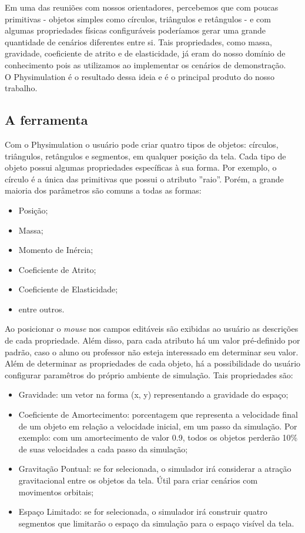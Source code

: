Em uma das reuniões com nossos orientadores, percebemos que com poucas primitivas - objetos simples como círculos, triângulos e retângulos - e com algumas propriedades físicas configuráveis poderíamos gerar uma grande quantidade de cenários diferentes entre si. Tais propriedades, como massa, gravidade, coeficiente de atrito e de elasticidade, já eram do nosso domínio de conhecimento pois as utilizamos ao implementar os cenários de demonstração. \\

O Physimulation é o resultado dessa ideia e é o principal produto do nosso trabalho.

\subsection{A ferramenta}
Com o Physimulation o usuário pode criar quatro tipos de objetos: círculos, triângulos, retângulos e segmentos, em qualquer posição da tela. Cada tipo de objeto possui algumas propriedades específicas à sua forma. Por exemplo, o círculo é a única das primitivas que possui o atributo ''raio''. Porém, a grande maioria dos parâmetros são comuns a todas as formas:

\begin{itemize}
	\item Posição;
	\item Massa;
	\item Momento de Inércia;
	\item Coeficiente de Atrito;
	\item Coeficiente de Elasticidade;
	\item entre outros.
\end{itemize} 

Ao posicionar o \textit{mouse} nos campos editáveis são exibidas ao usuário as descrições de cada propriedade. Além disso, para cada atributo há um valor pré-definido por padrão, caso o aluno ou professor não esteja interessado em determinar seu valor.\\

Além de determinar as propriedades de cada objeto, há a possibilidade do usuário configurar paramêtros do próprio ambiente de simulação. Tais propriedades são:

\begin{itemize}
	\item Gravidade: um vetor na forma (x, y) representando a gravidade do espaço;
	\item Coeficiente de Amortecimento: porcentagem que representa a velocidade final de um objeto em relação a velocidade inicial, em um passo da simulação. Por exemplo: com um amortecimento de valor 0.9, todos os objetos perderão 10\% de suas velocidades a cada passo da simulação;
	\item Gravitação Pontual: se for selecionada, o simulador irá considerar a atração gravitacional entre os objetos da tela. Útil para criar cenários com movimentos orbitais;
	\item Espaço Limitado: se for selecionada, o simulador irá construir quatro segmentos que limitarão o espaço da simulação para o espaço visível da tela.
\end{itemize} 

